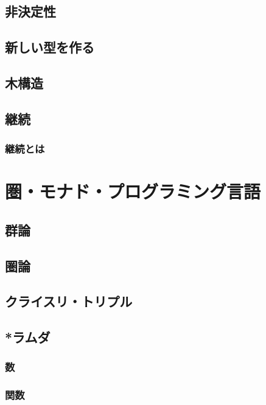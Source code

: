 \documentclass[twocolumn]{jsbook}
\begin{document}
\chapter{非決定性}

\chapter{新しい型を作る}

\chapter{木構造}

\chapter{継続}

\section{継続とは}




\part{圏・モナド・プログラミング言語}

\chapter{群論}

\chapter{圏論}

\chapter{クライスリ・トリプル}

\chapter{*ラムダ}

\section{数}

\section{関数}
\end{document}
